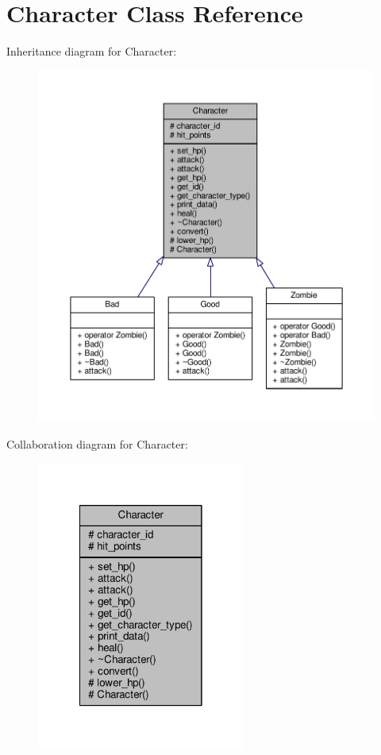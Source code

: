 \hypertarget{class_character}{\section{Character Class Reference}
\label{class_character}
}


Inheritance diagram for Character\-:
\nopagebreak
\begin{figure}[H]
\begin{center}
\leavevmode
\includegraphics[width=350pt]{class_character__inherit__graph}
\end{center}
\end{figure}


Collaboration diagram for Character\-:
\nopagebreak
\begin{figure}[H]
\begin{center}
\leavevmode
\includegraphics[width=194pt]{class_character__coll__graph}
\end{center}
\end{figure}
